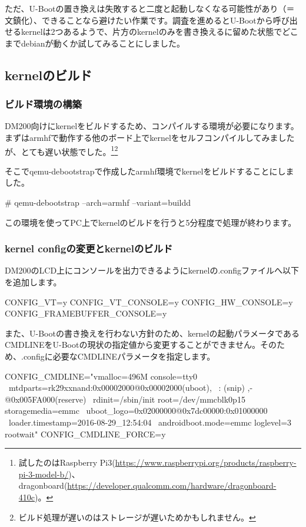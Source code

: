 \documentclass[mingoth,a4paper]{jsarticle}
\begin{document}
ただ、U-Bootの置き換えは失敗すると二度と起動しなくなる可能性があり（＝文鎮化）、できることなら避けたい作業です。調査を進めるとU-Bootから呼び出せるkernelは2つあるようで、片方のkernelのみを書き換えるに留めた状態でどこまでdebianが動くか試してみることにしました。

\subsection{kernelのビルド}

\subsubsection{ビルド環境の構築}

DM200向けにkernelをビルドするため、コンパイルする環境が必要になります。まずはarmhfで動作する他のボード上でkernelをセルフコンパイルしてみましたが、とても遅い状態でした。\footnote{試したのはRaspberry Pi3(\url{https://www.raspberrypi.org/products/raspberry-pi-3-model-b/})、dragonboard(\url{https://developer.qualcomm.com/hardware/dragonboard-410c})。}\footnote{ビルド処理が遅いのはストレージが遅いためかもしれません。}

そこでqemu-debootstrapで作成したarmhf環境でkernelをビルドすることにしました。

\begin{commandline}
# qemu-debootstrap --arch=armhf --variant=buildd
\end{commandline}

この環境を使ってPC上でkernelのビルドを行うと5分程度で処理が終わります。


\subsubsection{kernel configの変更とkernelのビルド}

DM200のLCD上にコンソールを出力できるようにkernelの.configファイルへ以下を追加します。

\begin{commandline}
CONFIG_VT=y
CONFIG_VT_CONSOLE=y
CONFIG_HW_CONSOLE=y
CONFIG_FRAMEBUFFER_CONSOLE=y
\end{commandline}

また、U-Bootの書き換えを行わない方針のため、kernelの起動パラメータであるCMDLINEをU-Bootの現状の指定値から変更することができません。そのため、.configに必要なCMDLINEパラメータを指定します。

\begin{commandline}
CONFIG_CMDLINE="vmalloc=496M console=tty0  \
mtdparts=rk29xxnand:0x00002000@0x00002000(uboot), \
  : (snip)
,-@0x005FA000(reserve) \
rdinit=/sbin/init root=/dev/mmcblk0p15 storagemedia=emmc \
uboot_logo=0x02000000@0x7dc00000:0x01000000 \
loader.timestamp=2016-08-29_12:54:04 \
androidboot.mode=emmc loglevel=3 rootwait"
CONFIG_CMDLINE_FORCE=y
\end{commandline}
\end{document}
